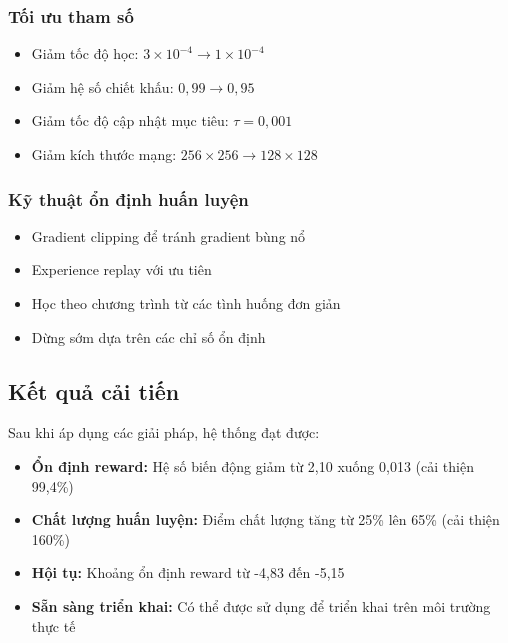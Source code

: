 \subsubsection{Tối ưu tham số}
\begin{itemize}
    \item Giảm tốc độ học: $3 \times 10^{-4}\rightarrow 1 \times 10^{-4}$

    \item Giảm hệ số chiết khấu: $0,99 \rightarrow 0,95$

    \item Giảm tốc độ cập nhật mục tiêu: $\tau = 0,001$

    \item Giảm kích thước mạng: $256 \times 256 \rightarrow 128 \times 128$
\end{itemize}

\subsubsection{Kỹ thuật ổn định huấn luyện}
\begin{itemize}
    \item Gradient clipping để tránh gradient bùng nổ

    \item Experience replay với ưu tiên

    \item Học theo chương trình từ các tình huống đơn giản

    \item Dừng sớm dựa trên các chỉ số ổn định
\end{itemize}

\subsection{Kết quả cải tiến}
Sau khi áp dụng các giải pháp, hệ thống đạt được:
\begin{itemize}
    \item \textbf{Ổn định reward:} Hệ số biến động giảm từ 2,10 xuống
        0,013 (cải thiện 99,4\%)

    \item \textbf{Chất lượng huấn luyện:} Điểm chất lượng tăng từ 25\% lên 65\% (cải thiện 160\%)

    \item \textbf{Hội tụ:} Khoảng ổn định reward từ -4,83 đến -5,15

    \item \textbf{Sẵn sàng triển khai:} Có thể được sử dụng để triển khai trên môi trường thực tế
\end{itemize}